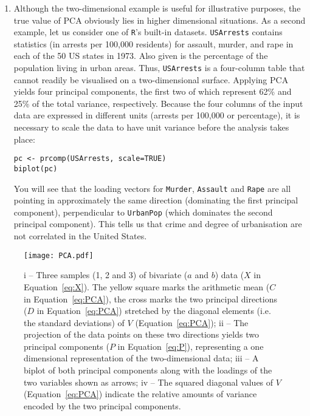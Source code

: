 \documentclass[11pt]{article}
\begin{document}
\begin{enumerate}
\item Although the two-dimensional example is useful for illustrative
  purposes, the true value of PCA obviously lies in higher dimensional
  situations. As a second example, let us consider one of \texttt{R}'s
  built-in datasets. \texttt{USArrests} contains statistics (in
  arrests per 100,000 residents) for assault, murder, and rape in each
  of the 50 US states in 1973. Also given is the percentage of the
  population living in urban areas. Thus, \texttt{USArrests} is a
  four-column table that cannot readily be visualised on a
  two-dimensional surface. Applying PCA yields four principal
  components, the first two of which represent 62\% and 25\% of the
  total variance, respectively. Because the four columns of the input
  data are expressed in different units (arrests per 100,000 or
  percentage), it is necessary to scale the data to have unit variance
  before the analysis takes place:

\begin{verbatim}
pc <- prcomp(USArrests, scale=TRUE) 
biplot(pc)
\end{verbatim}

  You will see that the loading vectors for \texttt{Murder},
  \texttt{Assault} and \texttt{Rape} are all pointing in approximately
  the same direction (dominating the first principal component),
  perpendicular to \texttt{UrbanPop} (which dominates the second
  principal component). This tells us that crime and degree of
  urbanisation are not correlated in the United States.

\end{enumerate}

\begin{figure}[!ht]
  \centering
  \texttt{[image: PCA.pdf]}
  \caption{i -- Three samples (1, 2 and 3) of bivariate ($a$ and $b$)
    data ($X$ in Equation~\ref{eq:X}). The yellow square marks the
    arithmetic mean ($C$ in Equation~\ref{eq:PCA}), the cross marks
    the two principal directions ($D$ in Equation~\ref{eq:PCA})
    stretched by the diagonal elements (i.e. the standard deviations)
    of $V$ (Equation~\ref{eq:PCA}); ii -- The projection of the data
    points on these two directions yields two principal components
    ($P$ in Equation~\ref{eq:P}), representing a one dimensional
    representation of the two-dimensional data; iii -- A biplot of
    both principal components along with the loadings of the two
    variables shown as arrows; iv -- The squared diagonal values of
    $V$ (Equation~\ref{eq:PCA}) indicate the relative amounts of
    variance encoded by the two principal components.}
  \label{fig:PCA}
\end{figure}
\end{document}
